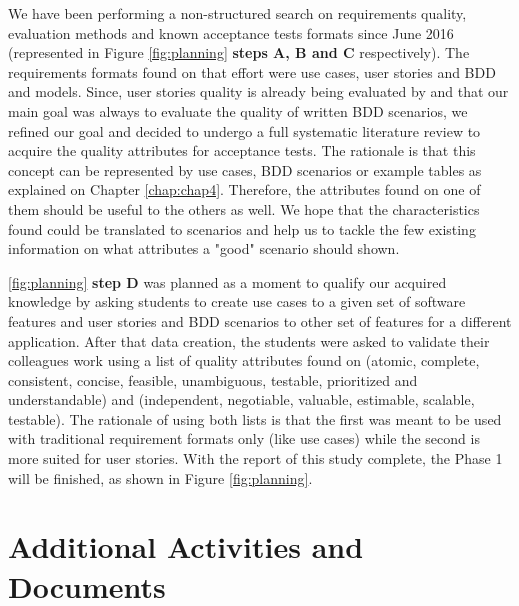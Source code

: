
We have been performing a non-structured search on requirements quality, evaluation methods and known acceptance tests formats since June 2016 (represented in Figure \ref{fig:planning} \textbf{steps A, B and C} respectively). The requirements formats found on that effort were use cases, user stories and BDD and models. Since, user stories quality is already being evaluated by \cite{Lucassen_2015} and that our main goal was always to evaluate the quality of written BDD scenarios, we refined our goal and decided to undergo a full systematic literature review to acquire the quality attributes for acceptance tests. The rationale is that this concept can be represented by use cases, BDD scenarios or example tables as explained on Chapter \ref{chap:chap4}. Therefore, the attributes found on one of them should be useful to the others as well. We hope that the characteristics found could be translated to scenarios and help us to tackle the few existing information on what attributes a "good" scenario should shown. 

\ref{fig:planning} \textbf{step D} was planned as a moment to qualify our acquired knowledge by asking students to create use cases to a given set of software features and user stories and BDD scenarios to other set of features for a different application. After that data creation, the students were asked to validate their colleagues work using a list of quality attributes found on \cite{Babok_2015} (atomic, complete, consistent, concise, feasible, unambiguous, testable, prioritized and understandable) and \cite{Cohn_2004} (independent, negotiable, valuable, estimable, scalable, testable). The rationale of using both lists is that the first was meant to be used with traditional requirement formats only (like use cases) while the second is more suited for user stories. With the report of this study complete, the Phase 1 will be finished, as shown in Figure \ref{fig:planning}. 

\section{Additional Activities and Documents}

